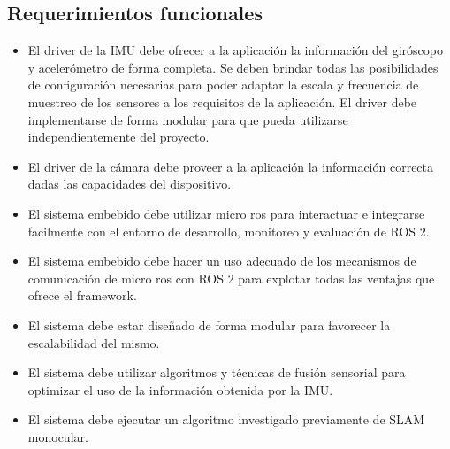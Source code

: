 \documentclass[
11pt, %
codirector, %
]{charter}
\begin{document}



\subsection{Requerimientos funcionales}
\begin{itemize}
	\item El driver de la IMU debe ofrecer a la aplicación la información del giróscopo y acelerómetro de forma completa. Se deben brindar todas las posibilidades de configuración necesarias para poder adaptar la escala y frecuencia de muestreo de los sensores a los requisitos de la aplicación. El driver debe implementarse de forma modular para que pueda utilizarse independientemente del proyecto.
	\item El driver de la cámara debe proveer a la aplicación la información correcta dadas las capacidades del dispositivo.
	\item El sistema embebido debe utilizar micro ros para interactuar e integrarse facilmente con el entorno de desarrollo, monitoreo y evaluación de ROS 2.
	\item El sistema embebido debe hacer un uso adecuado de los mecanismos de comunicación de micro ros con ROS 2 para explotar todas las ventajas que ofrece el framework.
	\item El sistema debe estar diseñado de forma modular para favorecer la escalabilidad del mismo.
	\item El sistema debe utilizar algoritmos y técnicas de fusión sensorial para optimizar el uso de la información obtenida por la IMU.
	\item El sistema debe ejecutar un algoritmo investigado previamente de SLAM monocular.
\end{itemize}
\end{document}

